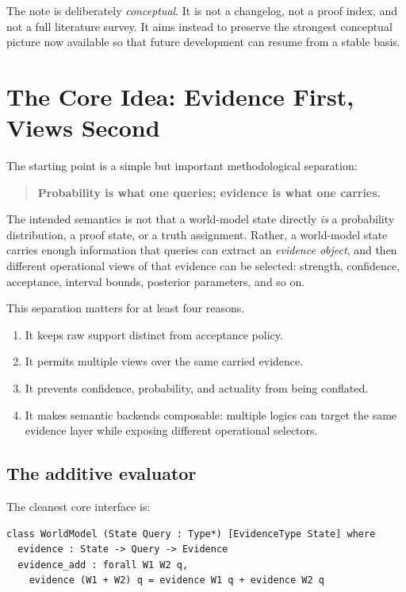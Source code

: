 \documentclass[11pt]{article}
\begin{document}
The note is deliberately \emph{conceptual}.  It is not a changelog, not a
proof index, and not a full literature survey.  It aims instead to preserve the
strongest conceptual picture now available so that future development can resume
from a stable basis.

\section{The Core Idea: Evidence First, Views Second}

The starting point is a simple but important methodological separation:
\begin{quote}
\textbf{Probability is what one queries; evidence is what one carries.}
\end{quote}

The intended semantics is not that a world-model state directly \emph{is} a
probability distribution, a proof state, or a truth assignment.  Rather, a
world-model state carries enough information that queries can extract an
\emph{evidence object}, and then different operational views of that evidence
can be selected: strength, confidence, acceptance, interval bounds, posterior
parameters, and so on.

This separation matters for at least four reasons.
\begin{enumerate}
  \item It keeps raw support distinct from acceptance policy.
  \item It permits multiple views over the same carried evidence.
  \item It prevents confidence, probability, and actuality from being conflated.
  \item It makes semantic backends composable: multiple logics can target the
        same evidence layer while exposing different operational selectors.
\end{enumerate}

\subsection{The additive evaluator}

The cleanest core interface is:
\begin{lstlisting}
class WorldModel (State Query : Type*) [EvidenceType State] where
  evidence : State -> Query -> Evidence
  evidence_add : forall W1 W2 q,
    evidence (W1 + W2) q = evidence W1 q + evidence W2 q
\end{lstlisting}
\end{document}
